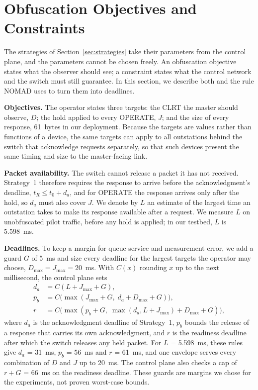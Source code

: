 \documentclass[conference]{IEEEtran}
\begin{document}
\section{Obfuscation Objectives and Constraints}
\label{sec:objectives}

The strategies of Section~\ref{sec:strategies} take their parameters from the control plane, and the parameters cannot be chosen freely. An obfuscation objective states what the observer should see; a constraint states what the control network and the switch must still guarantee. In this section, we describe both and the rule NOMAD uses to turn them into deadlines.

\textbf{Objectives.} The operator states three targets: the CLRT the master should observe, $D$; the hold applied to every OPERATE, $J$; and the size of every response, 61~bytes in our deployment. Because the targets are values rather than functions of a device, the same targets can apply to all outstations behind the switch that acknowledge requests separately, so that such devices present the same timing and size to the master-facing link.

\textbf{Packet availability.} The switch cannot release a packet it has not received. Strategy~1 therefore requires the response to arrive before the acknowledgment's deadline, $t_R \leq t_0 + d_a$, and for OPERATE the response arrives only after the hold, so $d_a$ must also cover $J$. We denote by $L$ an estimate of the largest time an outstation takes to make its response available after a request. We measure $L$ on unobfuscated pilot traffic, before any hold is applied; in our testbed, $L$ is 5.598~ms.

\textbf{Deadlines.} To keep a margin for queue service and measurement error, we add a guard $G$ of 5~ms and size every deadline for the largest targets the operator may choose, $D_{\max} = J_{\max} = 20$~ms. With $C(x)$ rounding $x$ up to the next millisecond, the control plane sets
\begin{equation}
\label{eq:envelope}
\begin{aligned}
d_a &= C(L + J_{\max} + G),\\
p_b &= C\big(\max(J_{\max} + G,\; d_a + D_{\max} + G)\big),\\
r &= C\big(\max(p_b + G,\; \max(d_a, L + J_{\max}) + D_{\max} + G)\big),
\end{aligned}
\end{equation}
where $d_a$ is the acknowledgment deadline of Strategy~1, $p_b$ bounds the release of a response that carries its own acknowledgment, and $r$ is the readiness deadline after which the switch releases any held packet. For $L$ = 5.598~ms, these rules give $d_a$ = 31~ms, $p_b$ = 56~ms and $r$ = 61~ms, and one envelope serves every combination of $D$ and $J$ up to 20~ms. The control plane also checks a cap of $r + G$ = 66~ms on the readiness deadline. These guards are margins we chose for the experiments, not proven worst-case bounds.
\end{document}
